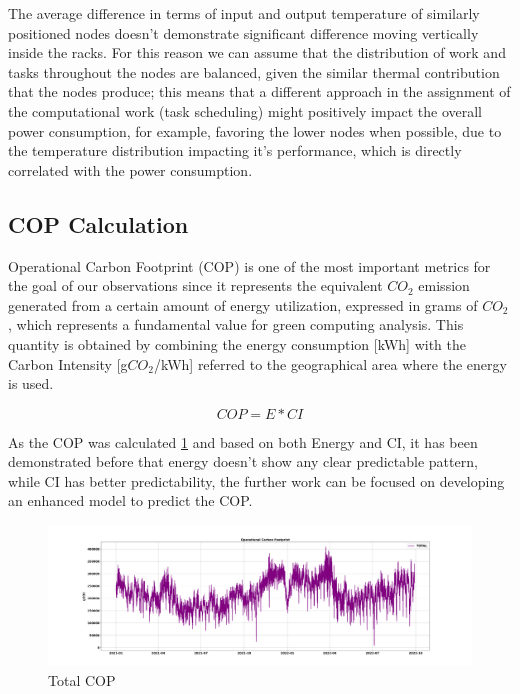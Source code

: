 The average difference in terms of input and output temperature of similarly positioned nodes doesn’t demonstrate significant difference moving vertically inside the racks.
For this reason we can assume that the distribution of work and tasks throughout the nodes are balanced, given the similar thermal contribution that the nodes produce;
this means that a different approach in the assignment of the computational work (task scheduling) might positively impact the overall power consumption, for example, favoring the lower nodes when possible, due to the temperature distribution impacting it’s performance, which is directly correlated with the power consumption.

\subsection{COP Calculation}
Operational Carbon Footprint (COP) is one of the most important metrics for the goal of our observations since it represents the equivalent $CO_2$ emission generated from a certain amount of energy utilization, expressed in grams of $CO_2$, which represents a fundamental value for green computing analysis.
This quantity is obtained by combining the energy consumption [kWh] with the Carbon Intensity [g$CO_2$/kWh] referred to the geographical area where the energy is used.

\[ COP = E * CI\]

As the COP was calculated \ref{fig:COP} and based on both Energy and CI, it has been demonstrated before that energy doesn’t show any clear predictable pattern, while CI has better predictability, the further work can be focused on developing an enhanced model to predict the COP.

\begin{figure}[H]
    \centering
    \includegraphics[width=1\textwidth]{Figures/COP_Total.png}
    \caption{Total COP}
    \label{fig:COP}
\end{figure}

